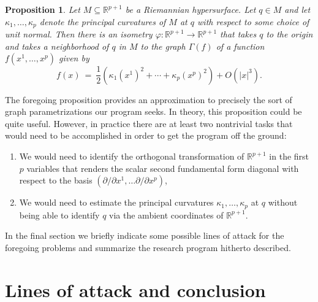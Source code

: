 \documentclass[11pt]{article}
\newcommand{\be}{\begin{equation}}
\newcommand{\ee}{\end{equation}}
\newtheorem{prop}[thm]{Proposition}
\newcommand{\foh}{\frac{1}{2}}
\newcommand{\R}{\ensuremath{\mathbb{R}}}
\numberwithin{equation}{section}
\begin{document}
\begin{prop} Let $M \subseteq \R^{p+1}$ be a Riemannian hypersurface. Let $q \in M$ and let $\kappa_1, \ldots, \kappa_p$ denote the principal curvatures of $M$ at $q$ with respect to some choice of unit normal. Then there is an isometry $\varphi: \R^{p+1} \to \R^{p+1}$ that takes $q$ to the origin and takes a neighborhood of $q$ in $M$ to the graph $\Gamma(f)$ of a function $f(x^1, \ldots, x^p)$ given by
\be
	f(x) \ = \ \foh\left( \kappa_1(x^1)^2 + \cdots + \kappa_p(x^p)^2\right) + O(|x|^3).	
\ee
\end{prop}
The foregoing proposition provides an approximation to precisely the sort of graph parametrizations our program seeks. In theory, this proposition could be quite useful. However, in practice there are at least two nontrivial tasks that would need to be accomplished in order to get the program off the ground:
\begin{enumerate}
\item We would need to identify the orthogonal transformation of $\R^{p+1}$ in the first $p$ variables that renders the scalar second fundamental form diagonal with respect to the basis $(\partial/\partial x^1, \ldots \partial/\partial x^p)$,
\item We would need to estimate the principal curvatures $\kappa_1, \ldots, \kappa_p$ at $q$ without being able to identify $q$ via the ambient coordinates of $\R^{p+1}$. 
\end{enumerate}
In the final section we briefly indicate some possible lines of attack for the foregoing problems and summarize the research program hitherto described. 


\section{Lines of attack and conclusion}
\end{document}
